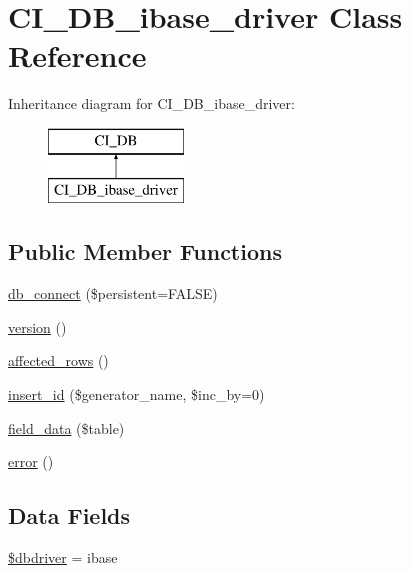 \hypertarget{class_c_i___d_b__ibase__driver}{}\section{C\+I\+\_\+\+D\+B\+\_\+ibase\+\_\+driver Class Reference}
\label{class_c_i___d_b__ibase__driver}
Inheritance diagram for C\+I\+\_\+\+D\+B\+\_\+ibase\+\_\+driver\+:\begin{figure}[H]
\begin{center}
\leavevmode
\includegraphics[height=2.000000cm]{class_c_i___d_b__ibase__driver}
\end{center}
\end{figure}
\subsection*{Public Member Functions}
\begin{DoxyCompactItemize}
\item 
\mbox{\hyperlink{class_c_i___d_b__ibase__driver_a52bf595e79e96cc0a7c907a9b45aeb4d}{db\+\_\+connect}} (\$persistent=F\+A\+L\+SE)
\item 
\mbox{\hyperlink{class_c_i___d_b__ibase__driver_a6080dae0886626b9a4cedb29240708b1}{version}} ()
\item 
\mbox{\hyperlink{class_c_i___d_b__ibase__driver_a77248aaad33eb132c04cc4aa3f4bc8cb}{affected\+\_\+rows}} ()
\item 
\mbox{\hyperlink{class_c_i___d_b__ibase__driver_a148521f11a2aad9f228af62f59ec5130}{insert\+\_\+id}} (\$generator\+\_\+name, \$inc\+\_\+by=0)
\item 
\mbox{\hyperlink{class_c_i___d_b__ibase__driver_a90355121e1ed009e0efdbd544ab56efa}{field\+\_\+data}} (\$table)
\item 
\mbox{\hyperlink{class_c_i___d_b__ibase__driver_a43b8d30b879d4f09ceb059b02af2bc02}{error}} ()
\end{DoxyCompactItemize}
\subsection*{Data Fields}
\begin{DoxyCompactItemize}
\item 
\mbox{\hyperlink{class_c_i___d_b__ibase__driver_a0cde2a16322a023d040aa7f725877597}{\$dbdriver}} = \textquotesingle{}ibase\textquotesingle{}
\end{DoxyCompactItemize}
